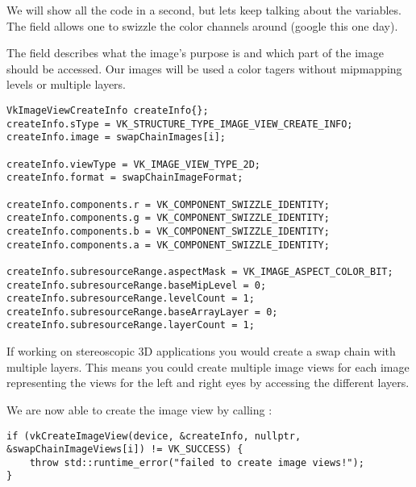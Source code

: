 \par We will show all the code in a second, but lets keep talking about the variables. The  field allows one to swizzle the color channels around (google this one day). 

\par The  field describes what the image's purpose is and which part of the image should be accessed. Our images will be used a color tagers without mipmapping levels or multiple layers.

\begin{center}
\begin{minipage}{0.95\linewidth}
\begin{lstlisting}
VkImageViewCreateInfo createInfo{};
createInfo.sType = VK_STRUCTURE_TYPE_IMAGE_VIEW_CREATE_INFO;
createInfo.image = swapChainImages[i];

createInfo.viewType = VK_IMAGE_VIEW_TYPE_2D;
createInfo.format = swapChainImageFormat;

createInfo.components.r = VK_COMPONENT_SWIZZLE_IDENTITY;
createInfo.components.g = VK_COMPONENT_SWIZZLE_IDENTITY;
createInfo.components.b = VK_COMPONENT_SWIZZLE_IDENTITY;
createInfo.components.a = VK_COMPONENT_SWIZZLE_IDENTITY;

createInfo.subresourceRange.aspectMask = VK_IMAGE_ASPECT_COLOR_BIT;
createInfo.subresourceRange.baseMipLevel = 0;
createInfo.subresourceRange.levelCount = 1;
createInfo.subresourceRange.baseArrayLayer = 0;
createInfo.subresourceRange.layerCount = 1;
\end{lstlisting}
\end{minipage}
\end{center}

\par If working on stereoscopic $3$D applications you would create a swap chain with multiple layers. This means you could create multiple image views for each image representing the views for the left and right eyes by accessing the different layers.

\par We are now able to create the image view by calling :

\begin{center}
\begin{minipage}{0.95\linewidth}
\begin{lstlisting}
if (vkCreateImageView(device, &createInfo, nullptr, &swapChainImageViews[i]) != VK_SUCCESS) {
    throw std::runtime_error("failed to create image views!");
}
\end{lstlisting}
\end{minipage}
\end{center}

